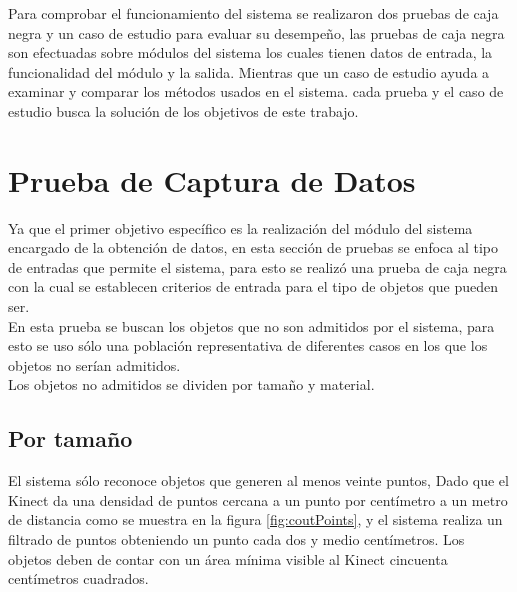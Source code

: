 




Para comprobar el funcionamiento del sistema se realizaron dos pruebas de caja negra y un caso de estudio para evaluar su desempeño, las pruebas de caja negra son efectuadas sobre módulos del sistema los cuales tienen datos de entrada, la funcionalidad del módulo y la salida. Mientras que un caso de estudio ayuda a examinar y comparar los métodos usados en el sistema. cada prueba y el caso de estudio busca la solución de los objetivos de este trabajo.

\section{Prueba de Captura de Datos}

	Ya que el primer objetivo específico es la realización del módulo del sistema encargado de la obtención de datos, en esta sección de pruebas se enfoca al tipo de entradas que permite el sistema, para esto se realizó una prueba de caja negra con la cual se establecen criterios de entrada para el tipo de objetos que pueden ser.\\
	
	En esta prueba se buscan los objetos que no son admitidos por el sistema, para esto se uso sólo una población representativa de diferentes casos en los que los objetos no serían admitidos.\\
	
	Los objetos no admitidos se dividen por tamaño y material.\\
	
	 \subsection{Por tamaño}
	
	 El sistema sólo reconoce objetos que generen al menos veinte puntos, Dado que el Kinect da una densidad de puntos cercana a un punto por centímetro a un metro de distancia como se muestra en la figura \ref{fig:coutPoints}, y el sistema realiza un filtrado de puntos obteniendo un punto cada dos y medio centímetros. Los objetos deben de contar con un área mínima visible al Kinect cincuenta centímetros cuadrados.\\
	 
